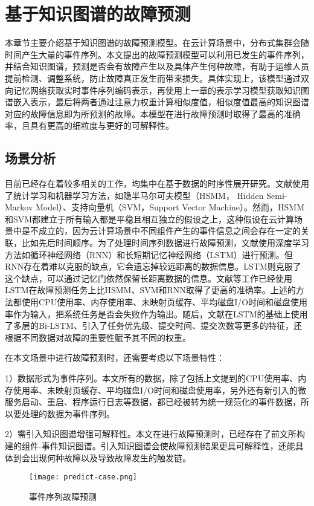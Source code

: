 \chapter{基于知识图谱的故障预测}\label{chapter-4}
本章节主要介绍基于知识图谱的故障预测模型。在云计算场景中，分布式集群会随时间产生大量的事件序列。本文提出的故障预测模型可以利用已发生的事件序列，并结合知识图谱，预测是否会有故障产生以及具体产生何种故障，有助于运维人员提前检测、调整系统，防止故障真正发生而带来损失。具体实现上，该模型通过双向记忆网络获取实时事件序列编码表示，再使用上一章的表示学习模型获取知识图谱嵌入表示，最后将两者通过注意力权重计算相似度值，相似度值最高的知识图谱对应的故障信息即为所预测的故障。本模型在进行故障预测时取得了最高的准确率，且具有更高的细粒度与更好的可解释性。
\section{场景分析}
目前已经存在着较多相关的工作，均集中在基于数据的时序性展开研究。文献\parencite{pitakrat2018hora,zhang2018prefix,baldoni2015line}使用了统计学习和机器学习方法，如隐半马尔可夫模型（HSMM， Hidden Semi-Markov Model）、支持向量机（SVM，Support Vector Machine）。然而，HSMM和SVM都建立于所有输入都是平稳且相互独立的假设之上，这种假设在云计算场景中是不成立的，因为云计算场景中不同组件产生的事件信息之间会存在一定的关联，比如先后时间顺序。为了处理时间序列数据进行故障预测，文献\parencite{xu2016health,cheng2018machine,du2017deeplog,das2018desh,islam2017predicting}使用深度学习方法如循环神经网络（RNN）和长短期记忆神经网络（LSTM）进行预测。但RNN存在着难以克服的缺点，它会遗忘掉较远距离的数据信息。LSTM则克服了这个缺点，可以通过记忆门依然保留长距离数据的信息。文献\parencite{cheng2018machine,du2017deeplog,das2018desh}等工作已经使用LSTM在故障预测任务上比HSMM、SVM和RNN取得了更高的准确率。上述的方法都使用CPU使用率、内存使用率、未映射页缓存、平均磁盘I/O时间和磁盘使用率作为输入，把系统任务是否会失败作为输出。随后，文献\parencite{gao2020task}在LSTM的基础上使用了多层的Bi-LSTM、引入了任务优先级、提交时间、提交次数等更多的特征，还根据不同数据对故障的重要性赋予其不同的权重。

在本文场景中进行故障预测时，还需要考虑以下场景特性：

1）数据形式为事件序列。本文所有的数据，除了包括上文提到的CPU使用率、内存使用率、未映射页缓存、平均磁盘I/O时间和磁盘使用率，另外还有新引入的微服务启动、重启、程序运行日志等数据，都已经被转为统一规范化的事件数据，所以要处理的数据为事件序列。

2）需引入知识图谱增强可解释性。本文在进行故障预测时，已经存在了前文所构建的组件-事件知识图谱。引入知识图谱会使故障预测结果更具可解释性，还能具体到会出现何种故障以及导致故障发生的触发链。
\begin{figure}[htbp]
    \centering
    \texttt{[image: predict-case.png]}
    \caption{事件序列故障预测\label{predict-case}}
\end{figure}

